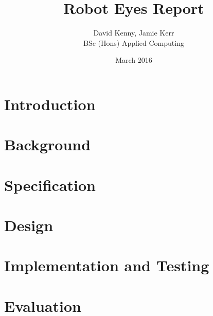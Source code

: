 \documentclass[twocolumn]{article}
\title{Robot Eyes Report}
\author{David Kenny, Jamie Kerr\\BSc (Hons) Applied Computing}
\date{March 2016}
\begin{document}
\maketitle


\begin{abstract}
 
\end{abstract}


\section{Introduction}
\vspace{-1ex}


\section{Background}
\vspace{-1ex}


\section{Specification}
\vspace{-1ex}


\section{Design}
\vspace{-1ex}



\section{Implementation and Testing}
\vspace{-1ex}




\section{Evaluation}
\vspace{-1ex}


\end{document}
